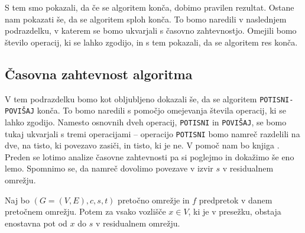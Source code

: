\documentclass[mat1]{fmfdelo}
\begin{document}
S tem smo pokazali, da če se algoritem konča, dobimo pravilen rezultat. Ostane nam pokazati še, da se algoritem sploh konča. To bomo naredili v naslednjem podrazdelku, v katerem se bomo ukvarjali s časovno zahtevnostjo. Omejili bomo število operacij, ki se lahko zgodijo, in s tem pokazali, da se algoritem res konča.\\

\subsection{Časovna zahtevnost algoritma}

V tem podrazdelku bomo kot obljubljeno dokazali še, da se algoritem \texttt{POTISNI-POVIŠAJ} konča. To bomo naredili s pomočjo omejevanja števila operacij, ki se lahko zgodijo. Namesto osnovnih dveh operacij, \texttt{POTISNI} in \texttt{POVIŠAJ}, se bomo tukaj ukvarjali s tremi operacijami -- operacijo \texttt{POTISNI} bomo namreč razdelili na dve, na tisto, ki povezavo zasiči, in tisto, ki je ne. V pomoč nam bo knjiga \cite{clrs}.\\

Preden se lotimo analize časovne zahtevnosti pa si poglejmo in dokažimo še eno lemo. Spomnimo se, da namreč dovolimo povezave v izvir $s$ v residualnem omrežju.\\

\begin{lema}\label{lem:enostavna_pot_s}
Naj bo $(G=(V,E),c,s,t)$ pretočno omrežje in $f$ predpretok v danem pretočnem omrežju. Potem za vsako vozlišče $x\in V$, ki je v presežku, obstaja enostavna pot od $x$ do $s$ v residualnem omrežju.
\end{lema}
\end{document}
